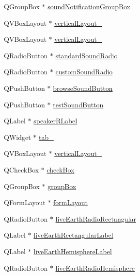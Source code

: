 \begin{DoxyCompactItemize}
\item 
QGroupBox $\ast$ \hyperlink{classUi__Preferences_a643214d4acc744082f2ab12e9920c42b}{soundNotificationGroupBox}
\item 
QVBoxLayout $\ast$ \hyperlink{classUi__Preferences_ada291fec660d38eddb347e9da5253d35}{verticalLayout\_}
\item 
QVBoxLayout $\ast$ \hyperlink{classUi__Preferences_aad94bab0c1ff59e70d9504a6a1059b57}{verticalLayout\_}
\item 
QRadioButton $\ast$ \hyperlink{classUi__Preferences_abe820ad572ad1d1bc9464e9fc1e91a81}{standardSoundRadio}
\item 
QRadioButton $\ast$ \hyperlink{classUi__Preferences_a14e5348186c9bd343b89528b172f51a1}{customSoundRadio}
\item 
QPushButton $\ast$ \hyperlink{classUi__Preferences_a687d18226c76dca51355fac0f77f09a9}{browseSoundButton}
\item 
QPushButton $\ast$ \hyperlink{classUi__Preferences_a47f2c2d39f53cc25b5e40b919481cee0}{testSoundButton}
\item 
QLabel $\ast$ \hyperlink{classUi__Preferences_aef659dd6026acb1ed7afaabdcdcf55b0}{speakerRLabel}
\item 
QWidget $\ast$ \hyperlink{classUi__Preferences_ae765fc291be2c2880f6981dbf106a573}{tab\_}
\item 
QVBoxLayout $\ast$ \hyperlink{classUi__Preferences_aa975484d171a6009bd13454e1daa5d1b}{verticalLayout\_}
\item 
QCheckBox $\ast$ \hyperlink{classUi__Preferences_adb394ae68ffd7dc787ff6395cab9b385}{checkBox}
\item 
QGroupBox $\ast$ \hyperlink{classUi__Preferences_a3cd5fd04e97e865d68cb74df58dd4a02}{groupBox}
\item 
QFormLayout $\ast$ \hyperlink{classUi__Preferences_a7cc960abfea6a199c966a734c6cd7472}{formLayout}
\item 
QRadioButton $\ast$ \hyperlink{classUi__Preferences_ace264d1e3cdc0323fc42af478d237474}{liveEarthRadioRectangular}
\item 
QLabel $\ast$ \hyperlink{classUi__Preferences_aecbe1aff951c2db302cafc5fa1a360d3}{liveEarthRectangularLabel}
\item 
QLabel $\ast$ \hyperlink{classUi__Preferences_a3df3e087ec1aad1431fdf2f3094ab18f}{liveEarthHemisphereLabel}
\item 
QRadioButton $\ast$ \hyperlink{classUi__Preferences_a36bc1ebcafd8d193a799520bf4f3e3e1}{liveEarthRadioHemisphere}
\item 

\end{DoxyCompactItemize}
